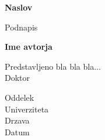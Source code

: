 \begin{center} \vspace*{1cm} 

\Huge

\textbf{Naslov} 

\vspace{0.5cm} \LARGE

Podnapis 

\vspace{1.5cm} 

\textbf{Ime avtorja} 

\vfill

Predstavljeno bla bla bla...\\ Doktor 

\vspace{0.8cm} 

\Large

Oddelek\\ Univerziteta\\ Drzava\\ Datum 

\end{center} 